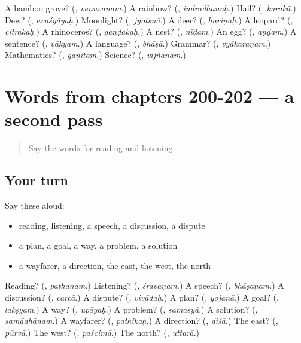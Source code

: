 \begin{tcolorbox}[breakable,colback=teal!4,colframe=teal!35!black,title={Before you move on}]
A bamboo grove? (\textbf{}, \emph{veṇuvanam}.) A rainbow? (\textbf{}, \emph{indradhanuḥ}.) Hail? (\textbf{}, \emph{karakā}.) Dew? (\textbf{}, \emph{avaśyāyaḥ}.) Moonlight? (\textbf{}, \emph{jyotsnā}.) A deer? (\textbf{}, \emph{hariṇaḥ}.) A leopard? (\textbf{}, \emph{citrakaḥ}.) A rhinoceros? (\textbf{}, \emph{gaṇḍakaḥ}.) A nest? (\textbf{}, \emph{nīḍam}.) An egg? (\textbf{}, \emph{aṇḍam}.) A sentence? (\textbf{}, \emph{vākyam}.) A language? (\textbf{}, \emph{bhāṣā}.) Grammar? (\textbf{}, \emph{vyākaraṇam}.) Mathematics? (\textbf{}, \emph{gaṇitam}.) Science? (\textbf{}, \emph{vijñānam}.)
\end{tcolorbox}
\section[(dialogue)]{Words from chapters 200-202 — a second pass}

\label{lesson:SA-R202-second-pass-words-from-chapters-200-202}



\begin{quote}
Say the words for reading and listening.
\end{quote}

\subsection*{Your turn}
Say these aloud:

\begin{itemize}
\raggedright
  \item reading, listening, a speech, a discussion, a dispute
  \item a plan, a goal, a way, a problem, a solution
  \item a wayfarer, a direction, the east, the west, the north
\end{itemize}

\begin{tcolorbox}[breakable,colback=teal!4,colframe=teal!35!black,title={Before you move on}]
Reading? (\textbf{}, \emph{paṭhanam}.) Listening? (\textbf{}, \emph{śravaṇam}.) A speech? (\textbf{}, \emph{bhāṣaṇam}.) A discussion? (\textbf{}, \emph{carcā}.) A dispute? (\textbf{}, \emph{vivādaḥ}.) A plan? (\textbf{}, \emph{yojanā}.) A goal? (\textbf{}, \emph{lakṣyam}.) A way? (\textbf{}, \emph{upāyaḥ}.) A problem? (\textbf{}, \emph{samasyā}.) A solution? (\textbf{}, \emph{samādhānam}.) A wayfarer? (\textbf{}, \emph{pathikaḥ}.) A direction? (\textbf{}, \emph{diśā}.) The east? (\textbf{}, \emph{pūrvā}.) The west? (\textbf{}, \emph{paścimā}.) The north? (\textbf{}, \emph{uttarā}.)
\end{tcolorbox}
